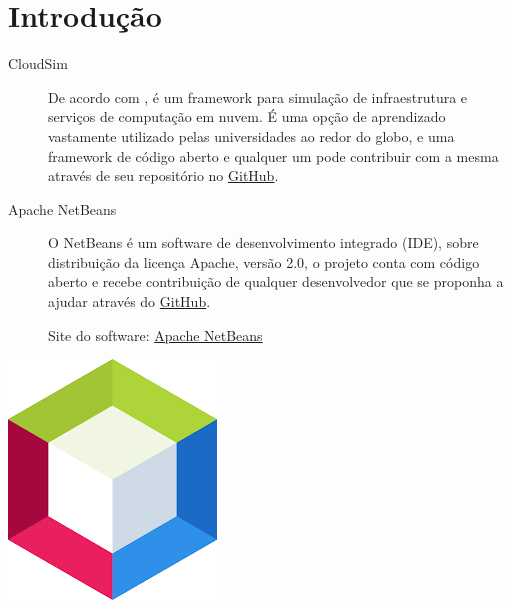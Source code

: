 
\section{Introdução}




\noindent \begin{minipage}[c]{0.6\textwidth}
  \vspace {1cm}
  \begin{description}
    \item [CloudSim] De acordo com , é um framework para simulação de infraestrutura e serviços de computação em nuvem.
    É uma opção de aprendizado vastamente utilizado pelas universidades ao redor do globo, e uma framework de código aberto e qualquer um pode contribuir com a mesma através de seu repositório no \href{https://github.com/Cloudslab}{GitHub}.
    \item [Apache NetBeans]  O NetBeans é um software de desenvolvimento integrado (IDE), sobre distribuição da licença Apache, versão 2.0, o projeto conta com código aberto e recebe contribuição de qualquer desenvolvedor que se proponha a ajudar através do \href{https://github.com/apache/netbeans-website/blob/master/netbeans.apache.org/src/content/index.adoc}{GitHub}.
\newline
    \par Site do software: \href{https://netbeans.apache.org/}{Apache NetBeans}
  \end{description}

\end{minipage}
\begin{minipage}[c]{0.4\textwidth}

  \includegraphics[width=\textwidth]{figure/netBeana.png}
  	\label{fig:netBeans}
\end{minipage}

